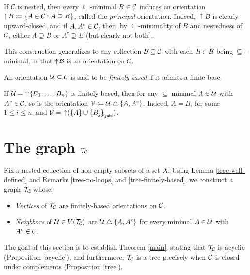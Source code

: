 \documentclass{amsart}
\begin{document}
    \begin{remark}
        If $\mathcal{C}$ is nested, then every $\subseteq$-minimal $B\in\mathcal{C}$ induces an orientation $\uparrow\!B\coloneqq\left\{A\in\mathcal{C}: A\supseteq B\right\}$, called the \textit{principal} orientation. Indeed, $\uparrow\!B$ is clearly upward-closed, and if $A,A^c\in\mathcal{C}$, then, by $\subseteq$-minimality of $B$ and nestedness of $\mathcal{C}$, either $A\supseteq B$ or $A^c\supseteq B$ (but clearly not both).

        This construction generalizes to any collection $\mathcal{B}\subseteq\mathcal{C}$ with each $B\in\mathcal{B}$ being $\subseteq$-minimal, in that $\uparrow\!\mathcal{B}$ is an orientation on $\mathcal{C}$.
    \end{remark}

    \begin{definition}
        An orientation $\mathcal{U}\subseteq\mathcal{C}$ is said to be \textit{finitely-based} if it admits a finite base.
    \end{definition}

    \begin{remark}\label{tree-finitely-based}
        If $\mathcal{U}=\,\,\uparrow\!\left\{B_1,\dots,B_n\right\}$ is finitely-based, then for any $\subseteq$-minimal $A\in\mathcal{U}$ with $A^c\in\mathcal{C}$, so is the orientation $\mathcal{V}\coloneqq\mathcal{U}\bigtriangleup\left\{A,A^c\right\}$. Indeed, $A=B_i$ for some $1\leq i\leq n$, and $\mathcal{V}=\,\,\uparrow\!(\left\{A\right\}\cup\left\{B_j\right\}_{j\neq i})$.
    \end{remark}

    \section{The graph $\mathcal{T}_{\mathcal{C}}$}

    Fix a nested collection of non-empty subsets of a set $X$. Using Lemma \ref{tree-well-defined} and Remarks \ref{tree-no-loops} and \ref{tree-finitely-based}, we construct a graph $\mathcal{T}_{\mathcal{C}}$ whose:
    \begin{itemize}
        \item \textit{Vertices} of $\mathcal{T}_{\mathcal{C}}$ are finitely-based orientations on $\mathcal{C}$.
        \item \textit{Neighbors} of $\mathcal{U}\in V(\mathcal{T}_{\mathcal{C}})$ are $\mathcal{U}\bigtriangleup\left\{A,A^c\right\}$ for every minimal $A\in\mathcal{U}$ with $A^c\in\mathcal{C}$.
    \end{itemize}

    The goal of this section is to establish Theorem \ref{main}, stating that $\mathcal{T}_{\mathcal{C}}$ is acyclic (Proposition \ref{acyclic}), and furthermore, $\mathcal{T}_{\mathcal{C}}$ is a tree precisely when $\mathcal{C}$ is closed under complements (Proposition \ref{tree}).
\end{document}
